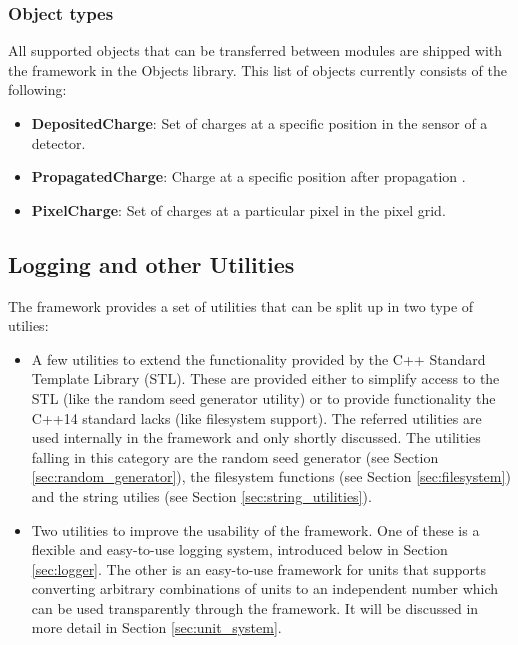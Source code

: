 \subsubsection{Object types}
All supported objects that can be transferred between modules are shipped with the framework in the Objects library. This list of objects currently consists of the following:
\begin{itemize}
\item \textbf{DepositedCharge}: Set of charges at a specific position in the sensor of a detector.
\item \textbf{PropagatedCharge}: Charge at a specific position after propagation .
\item \textbf{PixelCharge}: Set of charges at a particular pixel in the pixel grid.
\end{itemize}


\subsection{Logging and other Utilities}
\label{sec:logging_utilities}
The \apsq framework provides a set of utilities that can be split up in two type of utilies:
\begin{itemize}
\item A few utilities to extend the functionality provided by the C++ Standard Template Library (STL). These are provided either to simplify access to the STL (like the random seed generator utility) or to provide functionality the C++14 standard lacks (like filesystem support). The referred utilities are used internally in the framework and only shortly discussed. The utilities falling in this category are the random seed generator (see Section \ref{sec:random_generator}), the filesystem functions (see Section \ref{sec:filesystem}) and the string utilies (see Section \ref{sec:string_utilities}).
\item Two utilities to improve the usability of the framework. One of these is a flexible and easy-to-use logging system, introduced below in Section \ref{sec:logger}. The other is an easy-to-use framework for units that supports converting arbitrary combinations of units to an independent number which can  be used transparently through the framework. It will be discussed in more detail in Section \ref{sec:unit_system}.
\end{itemize}

